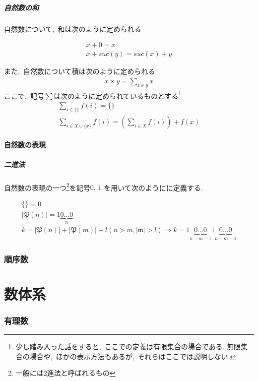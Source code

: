 \documentclass[hyperref,a4paper,12pt]{kininaruki}
\begin{document}
\subsubsection{自然数の和}
自然数について,\, 和は次のように定められる

\begin{align}
    x + 0 = x\\
    x + suc(y) = suc(x) + y
\end{align}

また,\, 自然数について積は次のように定められる
\begin{align}
    x\times y = \sum_{z\in y} x
\end{align}
ここで,\, 記号$\sum$は次のように定められているものとする\footnote{少し踏み入った話をすると,\, %
ここでの定義は有限集合の場合である.
無限集合の場合や,\, ほかの表示方法もあるが,\, それらはここでは説明しない.}
\begin{align}
    \sum_{i\in \{\}} f(i) = \{\}\\
    \sum_{i\in X\cup\{x\}} f(i) =\left(\sum_{i \in X} f(i)\right) + f(x)
\end{align}
\subsection{自然数の表現}
\subsubsection{二進法}
自然数の表現の一つ\footnote{一般には2進法と呼ばれるもの}を記号$0,\, 1$%
を用いて次のようにに定義する.
\begin{shadebox}
    \begin{align}
        \{\} = 0\\
        |\mathfrak{P}(n)| = 1{\underbrace{0...0}_{n}}\\
        k = |\mathfrak{P}(n)| + |\mathfrak{P}(m)| + l (n>m,|\mathfrak{m}|>l)%
        \Rightarrow k = 1{\underbrace{0...0}_{n-m-1}}1{\underbrace{0...0}_{n-m-1}}
    \end{align}
\end{shadebox}
\newpage
\section{順序数}
\newpage
\part{数体系}
\section{有理数}
\newpage
\end{document}
